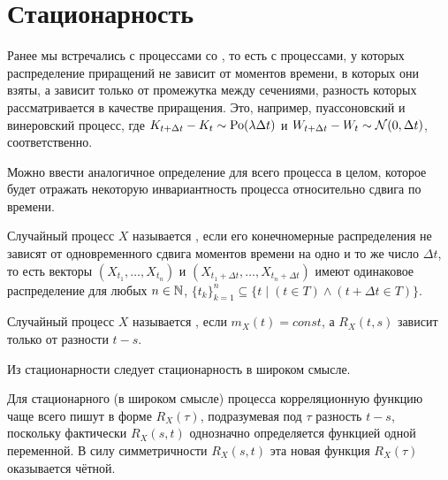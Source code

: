 \section{Стационарность} \label{section:stationarity}

Ранее мы встречались с процессами со ,
то есть с процессами, у которых распределение приращений не зависит от моментов времени,
в которых они взяты, а зависит только от промежутка между сечениями,
разность которых рассматривается в качестве приращения.
Это, например, пуассоновский и винеровский процесс,
где $ K_{t + \Delta t} - K_t \sim \textnormal{Po}(\lambda \Delta t) $ и $ W_{t + \Delta t} - W_t \sim \mathcal{N}(0, \Delta t) $, соответственно.

Можно ввести аналогичное определение для всего процесса в целом,
которое будет отражать некоторую инвариантность процесса относительно сдвига по времени.

\begin{definition}
    \label{definition:stationarity:strong_stationarity}
    Случайный процесс $ X $ называется ,
    если его конечномерные распределения не зависят от одновременного сдвига моментов времени на одно и то же число $ \Delta t $,
    то есть векторы $ (X_{t_1}, \ldots, X_{t_n}) $ и $ (X_{t_1 + \Delta t}, \ldots, X_{t_n + \Delta t}) $
    имеют одинаковое распределение для любых $ n \in \mathbb{N} $, $ \{ t_k \}_{k=1}^n \subseteq \{ t \mid (t \in T) \wedge (t + \Delta t \in T) \} $.
\end{definition}

\begin{definition}
    \label{definition:stationarity:weak_stationarity}
    Случайный процесс $ X $ называется ,
    если $ m_X(t) = const $, а $ R_X(t, s) $ зависит только от разности $ t - s $.
\end{definition}

\begin{remark}
    \label{remark:stationarity:strong_stationarity_from_weak}
    Из стационарности следует стационарность в широком смысле.
\end{remark}


Для стационарного (в широком смысле) процесса корреляционную функцию
чаще всего пишут в форме $ R_X(\tau) $,
подразумевая под $ \tau $ разность $ t - s $,
поскольку фактически $ R_X(s, t) $ однозначно определяется функцией одной переменной.
В силу симметричности $ R_X(s, t) $ эта новая функция $ R_X(\tau) $ оказывается чётной.

